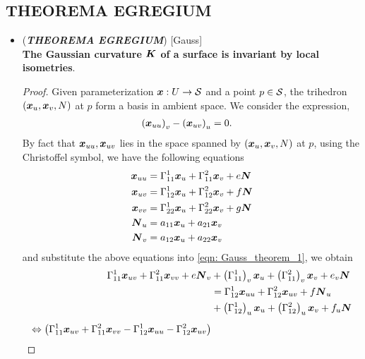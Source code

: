 \documentclass[11pt]{article}
\begin{document}
\subsection{THEOREMA EGREGIUM}
\begin{itemize}
\item \begin{theorem} \label{th: Gauss_theorem}
(\emph{\textbf{THEOREMA EGREGIUM}}) [Gauss]\\
\textbf{The Gaussian curvature $\boldsymbol{K}$ of a surface is invariant by local isometries}. 
\end{theorem}
\begin{proof}
Given parameterization $\boldsymbol{x}: U \rightarrow {\mathcal S}$ and a point $p\in {\mathcal S}$, the trihedron $(\boldsymbol{x}_{u}, \boldsymbol{x}_{v}, N)$ at $p$ form a basis in ambient space. We consider the expression, 
\begin{align}
\left(\boldsymbol{x}_{uu}\right)_{v} - \left(\boldsymbol{x}_{uv}\right)_{u} &= 0.  \label{eqn: Gauss_theorem_1}
\end{align}
By fact that $\boldsymbol{x}_{uu}, \boldsymbol{x}_{uv}$ lies in the space spanned by $(\boldsymbol{x}_{u}, \boldsymbol{x}_{v}, N)$ at $p$, using the Christoffel symbol, we have the following equations
\begin{align}
\boldsymbol{x}_{uu} &= \Gamma_{11}^{1}\boldsymbol{x}_{u} + \Gamma_{11}^{2}\boldsymbol{x}_{v} + e\boldsymbol{N}\nonumber\\
\boldsymbol{x}_{uv} &= \Gamma_{12}^{1}\boldsymbol{x}_{u} + \Gamma_{12}^{2}\boldsymbol{x}_{v} + f\boldsymbol{N}\nonumber\\
\boldsymbol{x}_{vv} &= \Gamma_{22}^{1}\boldsymbol{x}_{u} + \Gamma_{22}^{2}\boldsymbol{x}_{v} + g\boldsymbol{N}\nonumber\\
\boldsymbol{N}_{u} &= a_{11}\boldsymbol{x}_{u} + a_{21}\boldsymbol{x}_{v}
\nonumber\\
\boldsymbol{N}_{v} &= a_{12}\boldsymbol{x}_{u} + a_{22}\boldsymbol{x}_{v} \label{eqn: Gauss_theorem_2}
\end{align} 
and substitute the above equations into \eqref{eqn: Gauss_theorem_1}, we obtain
\begin{align*}
\Gamma_{11}^{1}\mb{x}_{uv} + \Gamma_{11}^{2}\mb{x}_{vv} + e\mb{N}_{v}
&+\paren{\Gamma_{11}^{1}}_{v}\mb{x}_{u} + \paren{\Gamma_{11}^{2}}_{v}\mb{x}_{v}+ e_{v}\mb{N}\\
&= \Gamma_{12}^{1}\mb{x}_{uu} + \Gamma_{12}^{2}\mb{x}_{uv} + f\mb{N}_{u}\\
&+ \paren{\Gamma_{12}^{1}}_{u}\mb{x}_{u} + \paren{\Gamma_{12}^{2}}_{u}\mb{x}_{v} + f_{u}\mb{N} \\[5pt]
\Leftrightarrow \paren{\Gamma_{11}^{1}\mb{x}_{uv} + \Gamma_{11}^{2}\mb{x}_{vv} - \Gamma_{12}^{1}\mb{x}_{uu} - \Gamma_{12}^{2}\mb{x}_{uv} }

\end{align*}
\end{proof}
\end{itemize}
\end{document}
